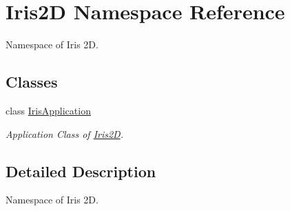 \hypertarget{namespace_iris2_d}{}\section{Iris2D Namespace Reference}
\label{namespace_iris2_d}


Namespace of Iris 2D.  


\subsection*{Classes}
\begin{DoxyCompactItemize}
\item 
class \hyperlink{class_iris2_d_1_1_iris_application}{Iris\+Application}
\begin{DoxyCompactList}\small\item\em Application Class of \hyperlink{namespace_iris2_d}{Iris2D}. \end{DoxyCompactList}\end{DoxyCompactItemize}


\subsection{Detailed Description}
Namespace of Iris 2D. 